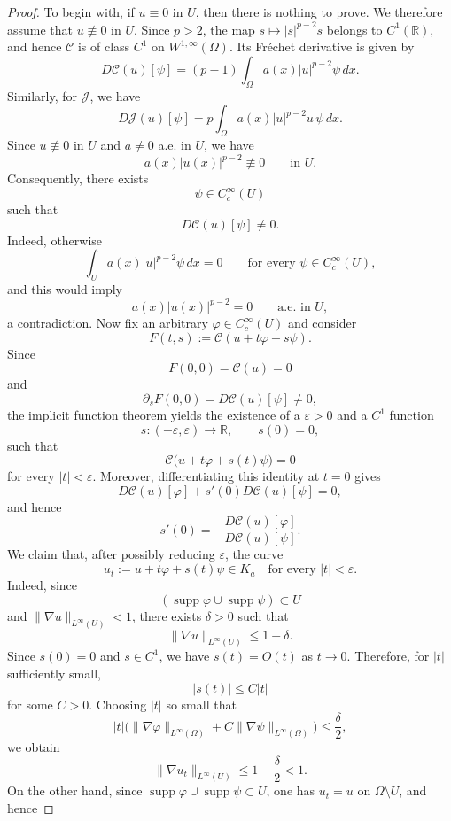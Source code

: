 \documentclass[10pt,a4paper]{amsart}
\begin{document}
\begin{proof}
To begin with, if $u\equiv0$ in $U$, then there is nothing to prove.
We therefore assume that $u\not\equiv0$ in $U$. Since $p>2$, the map
$s\mapsto |s|^{p-2}s$ belongs to $C^1(\mathbb R)$, and hence
$\mathcal C$ is of class $C^1$ on $W^{1,\infty}(\Omega)$. Its Fr\'echet
derivative is given by
$$
D\mathcal C(u)[\psi]
=
(p-1)\int_\Omega
a(x)|u|^{p-2}\psi\,dx.
$$
Similarly, for $\mathcal{J}$, we have
$$
D\mathcal J(u)[\psi]
=
p\int_\Omega
a(x)|u|^{p-2}u\,\psi\,dx.
$$
Since $u\not\equiv0$ in $U$ and $a\neq0$ a.e. in $U$, we have
$$
a(x)|u(x)|^{p-2}\not\equiv0
\qquad\text{in }U.
$$
Consequently, there exists
$$
\psi\in C_c^\infty(U)
$$
such that
\begin{equation}\label{eq:Cnotnull}
D\mathcal C(u)[\psi]\neq0.
\end{equation}
Indeed, otherwise
$$
\int_U a(x)|u|^{p-2}\psi\,dx=0
\qquad
\text{for every }\psi\in C_c^\infty(U),
$$
and this would imply
$$
a(x)|u(x)|^{p-2}=0
\qquad\text{a.e. in }U,
$$
a contradiction. Now fix an arbitrary $\varphi\in C_c^\infty(U)$ and consider
$$
F(t,s)
:=
\mathcal C(u+t\varphi+s\psi).
$$
Since
$$
F(0,0)=\mathcal C(u)=0
$$
and
$$
\partial_sF(0,0)
=
D\mathcal C(u)[\psi]\neq0,
$$
the implicit function theorem yields the existence of a $\varepsilon>0$ and a
$C^1$ function
$$
s:(-\varepsilon,\varepsilon)\to\mathbb R,
\qquad
s(0)=0,
$$
such that
$$
\mathcal C
\bigl(
u+t\varphi+s(t)\psi
\bigr)=0
$$
for every $|t|<\varepsilon$. Moreover, differentiating this identity at $t=0$ gives
$$
D\mathcal C(u)[\varphi]
+
s'(0)D\mathcal C(u)[\psi]
=0,
$$
and hence
\begin{equation} \label{eq:sprime}
s'(0)
=
-
\frac{
D\mathcal C(u)[\varphi]
}{
D\mathcal C(u)[\psi]
}.
\end{equation}
We claim that, after possibly reducing $\varepsilon$, the curve
$$
u_t:=u+t\varphi+s(t)\psi \in K_a \quad \text{for every } |t| < \varepsilon. 
$$
Indeed, since
$$
\left(\operatorname{supp}\varphi\cup\operatorname{supp}\psi \right)
\subset U
$$
and $\|\nabla u\|_{L^\infty(U)}<1$, there exists $\delta>0$ such that
$$
\|\nabla u\|_{L^\infty(U)}
\le 1-\delta.
$$
Since $s(0)=0$ and $s\in C^1$, we have $s(t)=O(t)$ as $t\to0$. Therefore, for $|t|$ sufficiently small,
$$
|s(t)|\leq C|t|
$$
for some $C>0$. Choosing $|t|$ so small that
$$
|t|\bigl(\|\nabla\varphi\|_{L^\infty(\Omega)}+C\|\nabla\psi\|_{L^\infty(\Omega)}\bigr)
\leq \frac{\delta}{2},
$$
we obtain
$$
\|\nabla u_t\|_{L^\infty(U)}
\leq 1-\frac{\delta}{2}<1.
$$
On the other hand, since $\operatorname{supp}\varphi\cup\operatorname{supp}\psi\subset U$, one has $u_t=u$ on $\Omega\setminus U$, and hence

\end{proof}
\end{document}
